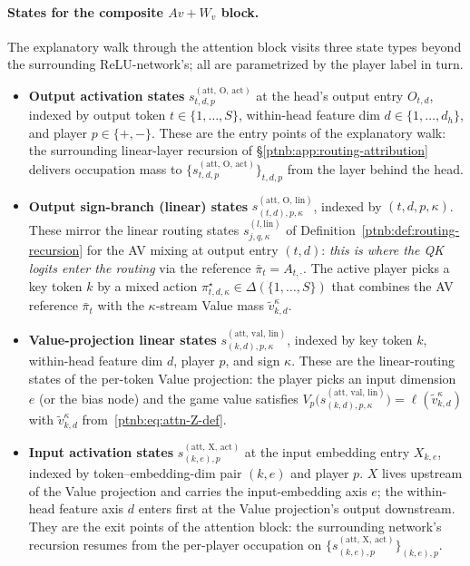 \paragraph{States for the composite $Av{+}W_v$ block.} The explanatory walk through the attention block visits three state types beyond the
surrounding ReLU-network's; all are parametrized by the player label in turn.
\begin{itemize}
    \item \textbf{Output activation states} $s_{t,d,p}^{(\mathrm{att},\,\mathrm{O},\,\mathrm{act})}$ at the
        head's output entry $O_{t,d}$, indexed by output token $t \in \{1,\dots,S\}$, within-head feature
        dim $d \in \{1,\dots,d_h\}$, and player $p \in \{+,-\}$. These are the entry points of the
        explanatory walk: the surrounding linear-layer recursion of \S\ref{ptnb:app:routing-attribution}
        delivers occupation mass to $\{s_{t,d,p}^{(\mathrm{att},\,\mathrm{O},\,\mathrm{act})}\}_{t,d,p}$
        from the layer behind the head.
    \item \textbf{Output sign-branch (linear) states}
        $s_{(t,d),p,\kappa}^{(\mathrm{att},\,\mathrm{O},\,\mathrm{lin})}$, indexed by $(t, d, p, \kappa)$.
        These mirror the linear routing states $s_{j,q,\kappa}^{(l,\mathrm{lin})}$ of
        Definition~\ref{ptnb:def:routing-recursion} for the AV mixing at output entry $(t, d)$: \emph{this is
        where the QK logits enter the routing} via the reference $\bar\pi_t = A_{t,\cdot}$. The active
        player picks a key token $k$ by a mixed action $\pi_{t,d,\kappa}^\star \in \Delta(\{1,\dots,S\})$
        that combines the AV reference $\bar\pi_t$ with the $\kappa$-stream Value mass
        $\tilde{v}_{k,d}^\kappa$.
    \item \textbf{Value-projection linear states}
        $s_{(k,d),p,\kappa}^{(\mathrm{att},\,\mathrm{val},\,\mathrm{lin})}$, indexed by key token $k$,
        within-head feature dim $d$, player $p$, and sign $\kappa$. These are the linear-routing states of
        the per-token Value projection: the player picks an input dimension $e$ (or the bias node) and the
        game value satisfies
        $V_p\!\bigl(s_{(k,d),p,\kappa}^{(\mathrm{att},\,\mathrm{val},\,\mathrm{lin})}\bigr) =
            \ell(\tilde{v}_{k,d}^\kappa)$ with $\tilde{v}_{k,d}^\kappa$ from~\eqref{ptnb:eq:attn-Z-def}.
    \item \textbf{Input activation states} $s_{(k,e),p}^{(\mathrm{att},\,\mathrm{X},\,\mathrm{act})}$ at the
        input embedding entry $X_{k,e}$, indexed by token--embedding-dim pair $(k,e)$ and player $p$. $X$
        lives upstream of the Value projection and carries the input-embedding axis $e$; the within-head
        feature axis $d$ enters first at the Value projection's output downstream. They are the exit points
        of the attention block: the surrounding network's recursion resumes from the per-player occupation
        on $\{s_{(k,e),p}^{(\mathrm{att},\,\mathrm{X},\,\mathrm{act})}\}_{(k,e),p}$.
\end{itemize}

